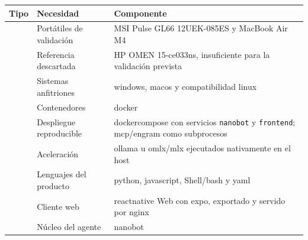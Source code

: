 \begin{table}
    \centering
    \scriptsize
    \setlength{\tabcolsep}{5pt}
    \renewcommand{\arraystretch}{1.12}
    \begin{tabularx}{\textwidth}{|>{\raggedright\arraybackslash}p{3.1cm}|>{\raggedright\arraybackslash}p{5.1cm}|>{\raggedright\arraybackslash}X|}
        \hline
        \textbf{Tipo}                    & \textbf{Necesidad}        & \textbf{Componente}                                                                                             \\
        \hline
        \multirow{2}{=}{Hardware}        & Portátiles de validación  & MSI Pulse GL66 12UEK-085ES y MacBook Air M4                                                                     \\
        \cline{2-3}
                                         & Referencia descartada     & HP OMEN 15-ce033ns, insuficiente para la validación prevista                                                    \\
        \hline
        \multirow{4}{=}{Infraestructura} & Sistemas anfitriones      & \Gls{windows}, \gls{macos} y compatibilidad \gls{linux}                                                         \\
        \cline{2-3}
                                         & Contenedores              & \Gls{docker}                                                                                                    \\
        \cline{2-3}
                                         & Despliegue reproducible   & \Gls{dockercompose} con servicios \texttt{nanobot} y \texttt{frontend}; \gls{mcp}/\gls{engram} como subprocesos \\
        \cline{2-3}
                                         & Aceleración               & \Gls{ollama} u \gls{omlx}/\gls{mlx} ejecutados nativamente en el host                                           \\
        \hline
        \multirow{12}{=}{Software}       & Lenguajes del producto    & \Gls{python}, \gls{javascript}, Shell/\gls{bash} y \gls{yaml}                                                   \\
        \cline{2-3}
                                         & Cliente web               & \Gls{reactnative} Web con \gls{expo}, exportado y servido por \gls{nginx}                                       \\
        \cline{2-3}
                                         & Núcleo del agente         & \Gls{nanobot}                                                                                                   \\

\end{tabularx}
\end{table}
